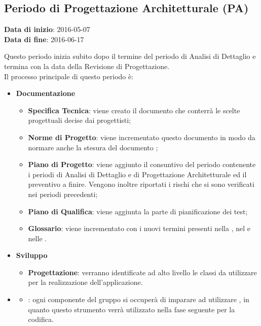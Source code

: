 	\subsection{Periodo di Progettazione Architetturale (PA)}
	\begin{center}
		\textbf{Data di inizio}: 2016-05-07 \\
		\textbf{Data di fine}: 2016-06-17 \\
	\end{center}
	Questo periodo inizia subito dopo il termine del periodo di Analisi di Dettaglio e termina con la data della Revisione di Progettazione. \\
	Il processo principale di questo periodo è:
		\begin{itemize}
			\item \textbf{Documentazione}
			\att
			\begin{itemize}
				\item \textbf{Specifica Tecnica}: viene creato il documento \STdocRP{} che conterrà le scelte progettuali decise dai progettisti; 
				\item \textbf{Norme di Progetto}: viene incrementato questo documento in modo da normare anche la stesura del documento \STdocRP;
				\item \textbf{Piano di Progetto}: viene aggiunto il consuntivo del periodo contenente i periodi di Analisi di Dettaglio e di Progettazione Architetturale ed il preventivo a finire. Vengono inoltre riportati i rischi che si sono verificati nei periodi precedenti;
				\item \textbf{Piano di Qualifica}: viene aggiunta la parte di pianificazione dei test;
				\item \textbf{Glossario}: viene incrementato con i nuovi termini presenti nella \STdocRP, nel \PQdocRP{} e nelle \NPdocRP.
			\end{itemize}
			\item \textbf{Sviluppo}
			\att
			\begin{itemize}
				\item \textbf{Progettazione}: verranno identificate ad alto livello le classi da utilizzare per la realizzazione dell'applicazione.
			\end{itemize}
			\item \textbf{}
			\att
			\begin{itemize}
				\item \textbf{}: ogni componente del gruppo si occuperà di imparare ad utilizzare , in quanto questo strumento verrà utilizzato nella fase seguente per la codifica.
			\end{itemize}
		
		\end{itemize}
